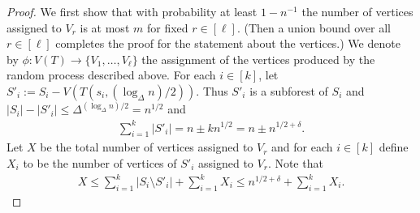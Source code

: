 \documentclass[a4paper, 11pt, reqno]{amsart}
\numberwithin{equation}{section}
\newcommand{\1}{{\rm 1\hspace*{-0.4ex}%
\rule{0.1ex}{1.52ex}\hspace*{0.2ex}}}
\begin{document}
\begin{proof}
We first show that with probability at least $1-n^{-1}$ the number of vertices assigned to $V_r$ is at most $m$ for fixed $r\in[\ell]$. 
(Then a union bound over all $r\in [\ell]$ completes the proof for the statement about the vertices.)
We denote by $\phi: V(T)\rightarrow \{V_1,\dots, V_{\ell}\}$ the assignment of the vertices produced by the random process described above. 
For each $i\in [k]$, let $S'_i:= S_i- V(T(s_i,(\log_{\Delta}n)/2))$. 
Thus $S'_i$ is a subforest of $S_i$ and $|S_i|- |S'_i|\leq \Delta^{(\log_{\Delta}n)/2}= n^{1/2}$ and 
\begin{align}\label{eq: sum S'}
\sum_{i=1}^{k} |S'_i| = n \pm k n^{1/2} = n \pm n^{1/2+\delta}.
\end{align} 
Let $X$ be the total number of vertices assigned to $V_r$ and for each $i\in [k]$ define $X_i$ to be the number of vertices of $S'_i$ assigned to $V_r$. Note that
\begin{align}\label{eq: X Si inequality}
X\leq \sum_{i=1}^{k} |S_i\setminus S'_i|+ \sum_{i=1}^{k}X_i\leq n^{1/2+\delta} + \sum_{i=1}^{k}X_i.
\end{align}



\end{proof}
\end{document}
